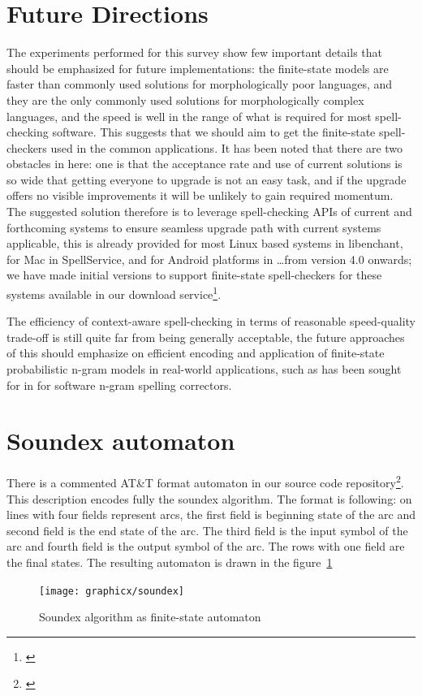 \documentclass[a4paper,12pt]{article}
\begin{document}
\section{Future Directions}
\label{sec:future}

The experiments performed for this survey show few important details that
should be emphasized for future implementations: the finite-state models are
faster than commonly used solutions for morphologically poor languages, and
they are the only commonly used solutions for morphologically complex
languages, and the speed is well in the range of what is required for most
spell-checking software. This suggests that we should aim to get the
finite-state spell-checkers used in the common applications. It has been noted
that there are two obstacles in here: one is that the acceptance rate and use
of current solutions is so wide that getting everyone to upgrade is not an
easy task, and if the upgrade offers no visible improvements it will be
unlikely to gain required momentum. The suggested solution therefore is to
leverage spell-checking APIs of current and forthcoming systems to ensure
seamless upgrade path with current systems applicable, this is already provided
for most Linux based systems in libenchant, for Mac in SpellService, and for
Android platforms in \ldots from version 4.0 onwards; we have made initial
versions to support finite-state spell-checkers for these systems available in
our download service\footnote{\url{}}.

The efficiency of context-aware spell-checking in terms of reasonable 
speed-quality trade-off is still quite far from being generally acceptable,
the future approaches of this should emphasize on efficient encoding and
application of finite-state probabilistic n-gram models in real-world
applications, such as has been sought for in \cite{} for software n-gram
spelling correctors.



\section*{Soundex automaton}
\label{appendix:soundex}

There is a commented AT\&T format automaton in our source code
repository\footnote{\url{}}. This description encodes fully the soundex
algorithm.  The format is following: on lines with four fields represent arcs,
the first field is beginning state of the arc and second field is the end state
of the arc. The third field is the input symbol of the arc and fourth field is
the output symbol of the arc. The rows with one field are the final states. The
resulting automaton is drawn in the figure~\ref{fig:soundex}

\begin{figure}
    \centering
    \texttt{[image: graphicx/soundex]}
    \caption{Soundex algorithm as finite-state automaton
    \label{fig:soundex}}
\end{figure}
\end{document}
